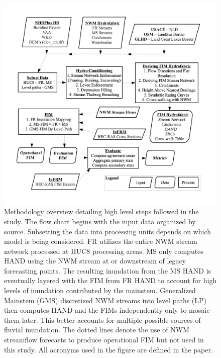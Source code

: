 \begin{figure}[H]
\centering
\includegraphics[scale=0.17]{figures/methods_overview.jpg}
\caption{
Methodology overview detailing high level steps followed in the study.
The flow chart begins with the input data organized by source.
Subsetting the data into processing units depends on which model is being considered.
FR utilizes the entire NWM stream network processed at HUC8 processing areas.
MS only computes HAND using the NWM stream at or downstream of legacy forecasting points.
The resulting inundation from the MS HAND is eventually layered with the FIM from FR HAND to account for high levels of inundation contributed by the mainstem.
Generalized Mainstem (GMS) discretized NWM streams into level paths (LP) then computes HAND and the FIMs independently only to mosaic them later. 
This better accounts for multiple possible sources of fluvial inundation.
The dotted lines denote the use of NWM streamflow forecasts to produce operational FIM but not used in this study.
All acronyms used in the figure are defined in the paper.
}
\label{fig:methods_overview}
\end{figure}
%
%
